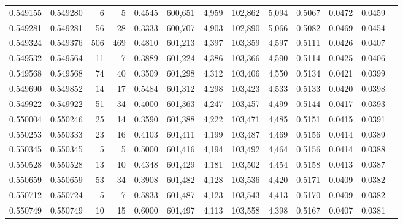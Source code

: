 \begin{tabular}{rrrrrrrrrrrrr}
0.549155 & 0.549280 &     6 &     5 &                                     0.4545 & 600,651 &   4,959 & 102,862 &   5,094 & 0.5067 & 0.0472 & 0.0459 \\
0.549281 & 0.549281 &    56 &    28 &                                     0.3333 & 600,707 &   4,903 & 102,890 &   5,066 & 0.5082 & 0.0469 & 0.0454 \\
0.549324 & 0.549376 &   506 &   469 &                                     0.4810 & 601,213 &   4,397 & 103,359 &   4,597 & 0.5111 & 0.0426 & 0.0407 \\
0.549532 & 0.549564 &    11 &     7 &                                     0.3889 & 601,224 &   4,386 & 103,366 &   4,590 & 0.5114 & 0.0425 & 0.0406 \\
0.549568 & 0.549568 &    74 &    40 &                                     0.3509 & 601,298 &   4,312 & 103,406 &   4,550 & 0.5134 & 0.0421 & 0.0399 \\
0.549690 & 0.549852 &    14 &    17 &                                     0.5484 & 601,312 &   4,298 & 103,423 &   4,533 & 0.5133 & 0.0420 & 0.0398 \\
0.549922 & 0.549922 &    51 &    34 &                                     0.4000 & 601,363 &   4,247 & 103,457 &   4,499 & 0.5144 & 0.0417 & 0.0393 \\
0.550004 & 0.550246 &    25 &    14 &                                     0.3590 & 601,388 &   4,222 & 103,471 &   4,485 & 0.5151 & 0.0415 & 0.0391 \\
0.550253 & 0.550333 &    23 &    16 &                                     0.4103 & 601,411 &   4,199 & 103,487 &   4,469 & 0.5156 & 0.0414 & 0.0389 \\
0.550345 & 0.550345 &     5 &     5 &                                     0.5000 & 601,416 &   4,194 & 103,492 &   4,464 & 0.5156 & 0.0414 & 0.0388 \\
0.550528 & 0.550528 &    13 &    10 &                                     0.4348 & 601,429 &   4,181 & 103,502 &   4,454 & 0.5158 & 0.0413 & 0.0387 \\
0.550659 & 0.550659 &    53 &    34 &                                     0.3908 & 601,482 &   4,128 & 103,536 &   4,420 & 0.5171 & 0.0409 & 0.0382 \\
0.550712 & 0.550724 &     5 &     7 &                                     0.5833 & 601,487 &   4,123 & 103,543 &   4,413 & 0.5170 & 0.0409 & 0.0382 \\
0.550749 & 0.550749 &    10 &    15 &                                     0.6000 & 601,497 &   4,113 & 103,558 &   4,398 & 0.5167 & 0.0407 & 0.0381 \\

\end{tabular}
